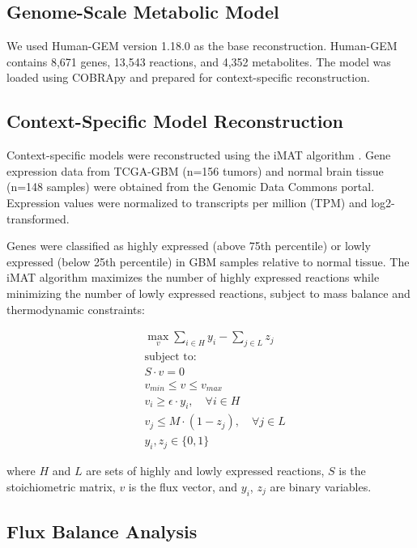 \documentclass[12pt, a4paper]{article}
\begin{document}
\subsection{Genome-Scale Metabolic Model}

We used Human-GEM version 1.18.0 \citep{wang2023human} as the base reconstruction. Human-GEM contains 8,671 genes, 13,543 reactions, and 4,352 metabolites. The model was loaded using COBRApy and prepared for context-specific reconstruction.

\subsection{Context-Specific Model Reconstruction}

Context-specific models were reconstructed using the iMAT algorithm \citep{zur2010mass}. Gene expression data from TCGA-GBM (n=156 tumors) and normal brain tissue (n=148 samples) were obtained from the Genomic Data Commons portal. Expression values were normalized to transcripts per million (TPM) and log2-transformed.

Genes were classified as highly expressed (above 75th percentile) or lowly expressed (below 25th percentile) in GBM samples relative to normal tissue. The iMAT algorithm maximizes the number of highly expressed reactions while minimizing the number of lowly expressed reactions, subject to mass balance and thermodynamic constraints:

\begin{equation}
\begin{aligned}
& \max_{v} \sum_{i \in H} y_i - \sum_{j \in L} z_j \\
& \text{subject to:} \\
& S \cdot v = 0 \\
& v_{min} \leq v \leq v_{max} \\
& v_i \geq \epsilon \cdot y_i, \quad \forall i \in H \\
& v_j \leq M \cdot (1 - z_j), \quad \forall j \in L \\
& y_i, z_j \in \{0, 1\}
\end{aligned}
\end{equation}

where $H$ and $L$ are sets of highly and lowly expressed reactions, $S$ is the stoichiometric matrix, $v$ is the flux vector, and $y_i$, $z_j$ are binary variables.

\subsection{Flux Balance Analysis}
\end{document}
